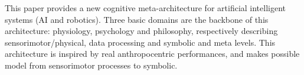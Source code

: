 This paper provides a new cognitive meta-architecture for artificial
intelligent systems (AI and robotics). Three basic domains are the backbone 
of this architecture: physiology, psychology and philosophy, respectively 
describing sensorimotor/physical, data processing and symbolic and meta levels.
This architecture is inspired by real anthropocentric performances, and makes 
possible model from sensorimotor processes to symbolic.